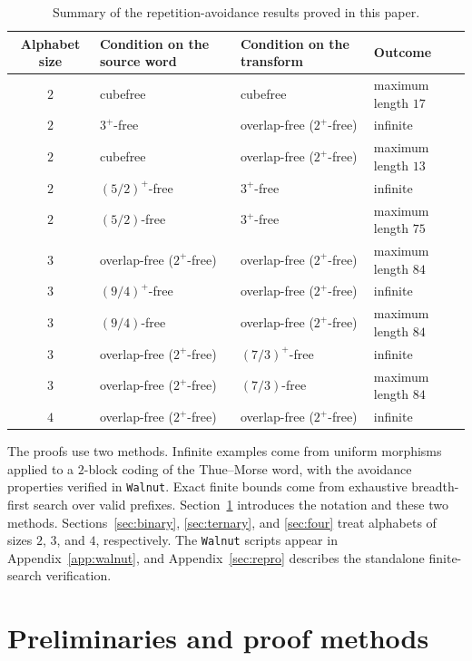 \documentclass[12pt,reqno]{article}
\begin{document}
\begin{table}[ht]
\centering
\small
\begin{tabular}{@{}c>{\raggedright\arraybackslash}p{}>{\raggedright\arraybackslash}p{}>{\raggedright\arraybackslash}p{}@{}}
\toprule
Alphabet size & Condition on the source word & Condition on the transform & Outcome \\
\midrule
$2$ & cubefree & cubefree & maximum length $17$ \\
$2$ & $3^+$-free & overlap-free ($2^+$-free) & infinite \\
$2$ & cubefree & overlap-free ($2^+$-free) & maximum length $13$ \\
$2$ & $(5/2)^+$-free & $3^+$-free & infinite \\
$2$ & $(5/2)$-free & $3^+$-free & maximum length $75$ \\
\midrule
$3$ & overlap-free ($2^+$-free) & overlap-free ($2^+$-free) & maximum length $84$ \\
$3$ & $(9/4)^+$-free & overlap-free ($2^+$-free) & infinite \\
$3$ & $(9/4)$-free & overlap-free ($2^+$-free) & maximum length $84$ \\
$3$ & overlap-free ($2^+$-free) & $(7/3)^+$-free & infinite \\
$3$ & overlap-free ($2^+$-free) & $(7/3)$-free & maximum length $84$ \\
\midrule
$4$ & overlap-free ($2^+$-free) & overlap-free ($2^+$-free) & infinite \\
\bottomrule
\end{tabular}
\caption{Summary of the repetition-avoidance results proved in this paper. }
\label{tab:results}
\end{table}

The proofs use two methods.  Infinite examples come from uniform morphisms applied to a $2$-block coding of the Thue--Morse word, with the avoidance properties verified in {\tt Walnut}.  Exact finite bounds come from exhaustive breadth-first search over valid prefixes.  Section~\ref{sec:prelim} introduces the notation and these two methods.  Sections~\ref{sec:binary}, \ref{sec:ternary}, and \ref{sec:four} treat alphabets of sizes $2$, $3$, and $4$, respectively.  The {\tt Walnut} scripts appear in Appendix~\ref{app:walnut}, and Appendix~\ref{sec:repro} describes the standalone finite-search verification.

\section{Preliminaries and proof methods}
\label{sec:prelim}
\end{document}
